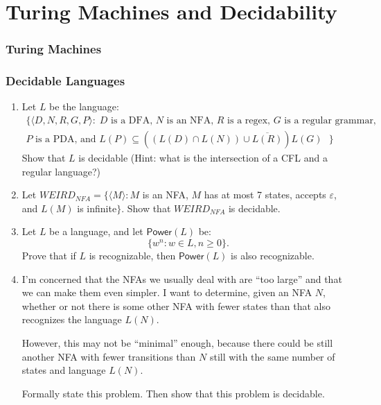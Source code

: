\part{Turing Machines and Decidability}

\section{Turing Machines}

\section{Decidable Languages}

\begin{enumerate}[resume]
	
\item {} Let $L$ be the language:
\begin{align*}
\{ \langle D, N, R, G, P \rangle :\;\text{$D$ is a DFA, $N$ is an NFA, $R$ is a regex, $G$ is a regular grammar,}\\
\text{$P$ is a PDA, and $L(P) \subseteq ((L(D) \cap L(N)) \cup \overline{L(R)}) L(G)$ }   \}
\end{align*}
Show that $L$ is decidable (Hint: what is the intersection of a CFL and a regular language?)

\item {} Let $WEIRD_{NFA} = \{ \langle M \rangle : M$ is an NFA, $M$ has at most 7 states, accepts $\varepsilon$, and $L(M)$ is infinite$\}$.
Show that $WEIRD_{NFA}$ is decidable.

\item {} Let $L$ be a language, and let $\textsf{Power}(L)$ be:
\[
\{ w^n : w \in L, n \ge 0 \}.
\]
Prove that if $L$ is recognizable, then $\textsf{Power}(L)$ is also recognizable.

\item {} I'm concerned that the NFAs we usually deal with are ``too large'' and that we can make them even simpler. I want to determine, given an NFA $N$, whether or not there is some other NFA with fewer states than that also recognizes the language $L(N)$. 

However, this may not be ``minimal'' enough, because there could be still another NFA with fewer transitions than $N$ still with the same number of states and language $L(N)$. 

Formally state this problem. Then show that this problem is decidable.


\end{enumerate}
